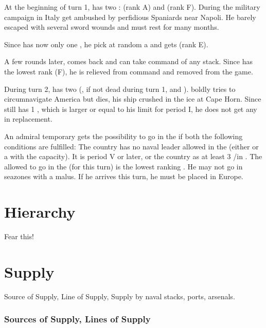 \begin{exemple}
  At the beginning of turn 1, \FRA has two \LeaderG :  (rank A)
  and  (rank F). During the military campaign in Italy 
  get ambushed by perfidious Spaniards near Napoli. He barely escaped with
  several sword wounds and must rest for many months.

  Since \FRA has now only one \LeaderG, he pick at random a \anonyme\LeaderG
  and gets  (rank E).

  A few rounds later,  comes back and can take command of any
  stack. Since  has the lowest rank (F), he is relieved from command
  and removed from the game.

  \smallskip

  During turn 2, \POR has two \LeaderE (, if not dead during turn
  1, and ).  boldly tries to circumnavigate
  America but dies, his ship crushed in the ice at Cape Horn. Since \POR still
  has 1 \LeaderE, which is larger or equal to his limit for period I, he does
  not get any \anonyme\LeaderE in replacement.
\end{exemple}

An admiral temporary gets the possibility to go in the \ROTW if both the
following conditions are fulfilled:
\bparag The country has no naval leader allowed in the \ROTW (either \LeaderE
or a \LeaderA with the \ROTW capacity).
\bparag It is period V or later, or the country as at least 3 \COL/\TP in
.
\bparag The \LeaderA allowed to go in the \ROTW (for this turn) is the lowest
ranking \LeaderA. He may not go in seazones with a malus. If he arrives this
turn, he must be placed in Europe.

\section{Hierarchy}
Fear this!

\section{Supply}
Source of Supply, Line of Supply, Supply by naval stacks, ports, arsenals.

\subsubsection{Sources of Supply, Lines of Supply}

